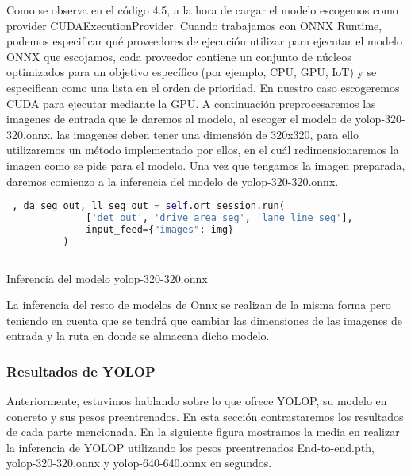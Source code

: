         Como se observa en el código 4.5, a la hora de cargar el modelo escogemos como provider CUDAExecutionProvider. Cuando trabajamos con ONNX Runtime, 
        podemos especificar qué proveedores de ejecución utilizar para ejecutar el modelo ONNX que escojamos, cada proveedor contiene un conjunto de núcleos optimizados para un objetivo específico (por ejemplo, CPU, GPU, IoT) y 
        se especifican como una lista en el orden de prioridad. En nuestro caso escogeremos CUDA para ejecutar mediante la GPU. 
        \newline
        A continuación preprocesaremos las imagenes de entrada que le daremos al modelo, al escoger el modelo de yolop-320-320.onnx, las imagenes deben tener una dimensión de 320x320, para ello
        utilizaremos un método implementado por ellos, en el cuál redimensionaremos la imagen como se pide para el modelo. 
        Una vez que tengamos la imagen preparada, daremos comienzo a la inferencia del modelo de yolop-320-320.onnx. 
        \newpage

        \begin{code}[h]
          \begin{lstlisting}[language=Python]
            _, da_seg_out, ll_seg_out = self.ort_session.run(
              ['det_out', 'drive_area_seg', 'lane_line_seg'],
              input_feed={"images": img}
          )
        
          \end{lstlisting}
          \caption[Inferencia del modelo yolop-320-320.onnx]{Inferencia del modelo yolop-320-320.onnx}
          \label{cod:codejemplo}
          \end{code}  

        La inferencia del resto de modelos de Onnx se realizan de la misma forma pero teniendo en cuenta que se tendrá que cambiar las dimensiones de las imagenes de entrada y la ruta
        en donde se almacena dicho modelo. 


\subsubsection{Resultados de YOLOP }
\label{sec:resultados}
Anteriormente, estuvimos hablando sobre lo que ofrece YOLOP, su modelo en concreto y sus pesos preentrenados. En esta sección contrastaremos los resultados de cada parte mencionada. \newline
En la siguiente figura mostramos la media en realizar la inferencia de YOLOP utilizando los pesos preentrenados End-to-end.pth, yolop-320-320.onnx y yolop-640-640.onnx en segundos.


